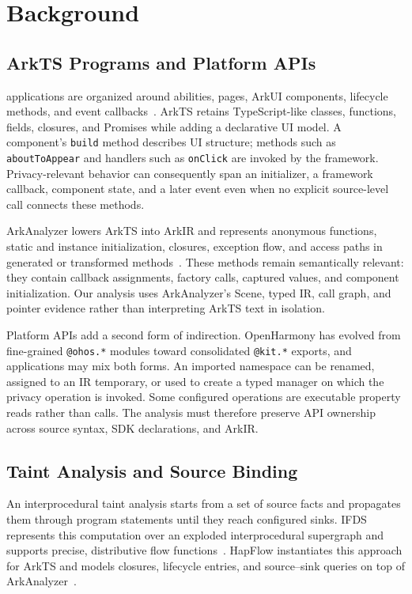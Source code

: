 \section{Background}
\label{sec:background}

\subsection{ArkTS Programs and Platform APIs}

\openharmony applications are organized around abilities, pages, ArkUI components, lifecycle methods, and event callbacks~\cite{openharmony,arktsdoc}. ArkTS retains TypeScript-like classes, functions, fields, closures, and Promises while adding a declarative UI model. A component's \texttt{build} method describes UI structure; methods such as \texttt{aboutToAppear} and handlers such as \texttt{onClick} are invoked by the framework. Privacy-relevant behavior can consequently span an initializer, a framework callback, component state, and a later event even when no explicit source-level call connects these methods.

ArkAnalyzer lowers ArkTS into ArkIR and represents anonymous functions, static and instance initialization, closures, exception flow, and access paths in generated or transformed methods~\cite{arkanalyzer}. These methods remain semantically relevant: they contain callback assignments, factory calls, captured values, and component initialization. Our analysis uses ArkAnalyzer's Scene, typed IR, call graph, and pointer evidence rather than interpreting ArkTS text in isolation.

Platform APIs add a second form of indirection. OpenHarmony has evolved from fine-grained \texttt{@ohos.*} modules toward consolidated \texttt{@kit.*} exports, and applications may mix both forms. An imported namespace can be renamed, assigned to an IR temporary, or used to create a typed manager on which the privacy operation is invoked. Some configured operations are executable property reads rather than calls. The analysis must therefore preserve API ownership across source syntax, SDK declarations, and ArkIR.

\subsection{Taint Analysis and Source Binding}

An interprocedural taint analysis starts from a set of source facts and propagates them through program statements until they reach configured sinks. IFDS represents this computation over an exploded interprocedural supergraph and supports precise, distributive flow functions~\cite{reps95,sagiv96}. HapFlow instantiates this approach for ArkTS and models closures, lifecycle entries, and source--sink queries on top of ArkAnalyzer~\cite{hapflow}.

